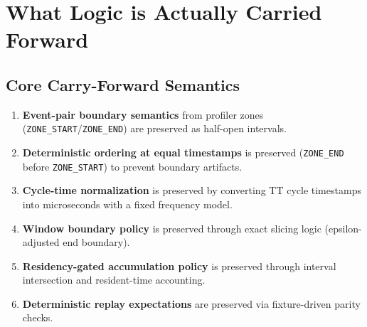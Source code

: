 \documentclass[11pt,a4paper]{article}
\begin{document}
\section{What Logic is Actually Carried Forward}
\subsection*{Core Carry-Forward Semantics}
\begin{enumerate}[leftmargin=*]
  \item \textbf{Event-pair boundary semantics} from profiler zones (\texttt{ZONE\_START}/\texttt{ZONE\_END}) are preserved as half-open intervals.
  \item \textbf{Deterministic ordering at equal timestamps} is preserved (\texttt{ZONE\_END} before \texttt{ZONE\_START}) to prevent boundary artifacts.
  \item \textbf{Cycle-time normalization} is preserved by converting TT cycle timestamps into microseconds with a fixed frequency model.
  \item \textbf{Window boundary policy} is preserved through exact slicing logic (epsilon-adjusted end boundary).
  \item \textbf{Residency-gated accumulation policy} is preserved through interval intersection and resident-time accounting.
  \item \textbf{Deterministic replay expectations} are preserved via fixture-driven parity checks.
\end{enumerate}
\end{document}
